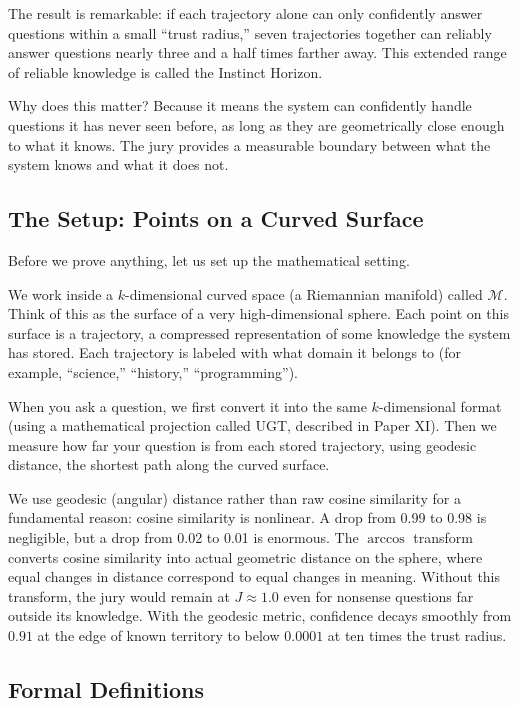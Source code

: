 \documentclass[11pt]{article}
\begin{document}
The result is remarkable: if each trajectory alone can only confidently answer
questions within a small ``trust radius,'' seven trajectories together can
reliably answer questions nearly three and a half times farther away. This
extended range of reliable knowledge is called the Instinct Horizon.

Why does this matter? Because it means the system can confidently handle
questions it has never seen before, as long as they are geometrically close
enough to what it knows. The jury provides a measurable boundary
between what the system knows and what it does not.

\subsection{The Setup: Points on a Curved Surface}

Before we prove anything, let us set up the mathematical setting.

We work inside a $k$-dimensional curved space (a Riemannian manifold) called
$\mathcal{M}$. Think of this as the surface of a very high-dimensional sphere.
Each point on this surface is a trajectory, a compressed
representation of some knowledge the system has stored. Each trajectory is
labeled with what domain it belongs to (for example, ``science,'' ``history,''
``programming'').

When you ask a question, we first convert it into the same $k$-dimensional
format (using a mathematical projection called UGT, described in Paper XI).
Then we measure how far your question is from each stored trajectory, using
geodesic distance, the shortest path along the curved surface.

We use geodesic (angular) distance rather than raw cosine similarity for a
fundamental reason: cosine similarity is nonlinear. A drop from 0.99 to 0.98
is negligible, but a drop from 0.02 to 0.01 is enormous. The $\arccos$
transform converts cosine similarity into actual geometric distance on the
sphere, where equal changes in distance correspond to equal changes in
meaning. Without this transform, the jury would remain at $J \approx 1.0$
even for nonsense questions far outside its knowledge. With the geodesic
metric, confidence decays smoothly from $0.91$ at the edge of known territory
to below $0.0001$ at ten times the trust radius.

\subsection{Formal Definitions}
\end{document}
